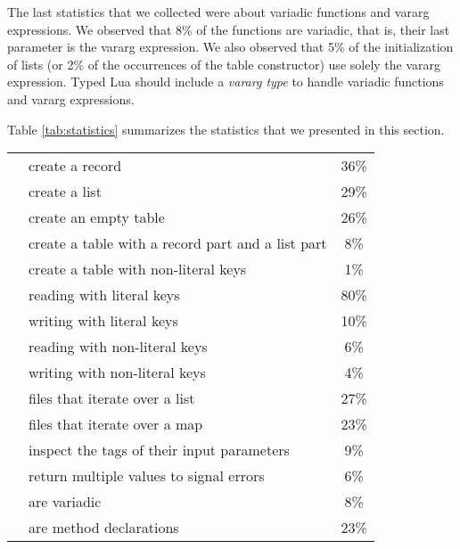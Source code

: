 The last statistics that we collected were about variadic functions
and vararg expressions.
We observed that 8\% of the functions are variadic, that is,
their last parameter is the vararg expression.
We also observed that 5\% of the initialization of lists
(or 2\% of the occurrences of the table constructor) use solely the
vararg expression.
Typed Lua should include a \emph{vararg type} to handle variadic
functions and vararg expressions.

Table \ref{tab:statistics} summarizes the statistics that we presented in this section.

\begin{table}[!ht]
\begin{center}
\begin{tabular}{|p{6cm}|p{6cm}|c|}
\hline
{}
& create a record & 36\% \\
& create a list & 29\% \\
& create an empty table & 26\% \\
& create a table with a record part and a list part & 8\% \\
& create a table with non-literal keys & 1\% \\
\hline
{}
& reading with literal keys & 80\% \\
& writing with literal keys & 10\% \\
& reading with non-literal keys & 6\% \\
& writing with non-literal keys & 4\% \\
\hline
{} &
files that iterate over a list & 27\% \\
& files that iterate over a map & 23\% \\
\hline
{}
& inspect the tags of their input parameters & 9\% \\
& return multiple values to signal errors & 6\% \\
& are variadic & 8\% \\
& are method declarations & 23\% \\

\end{tabular}
\end{center}
\end{table}
